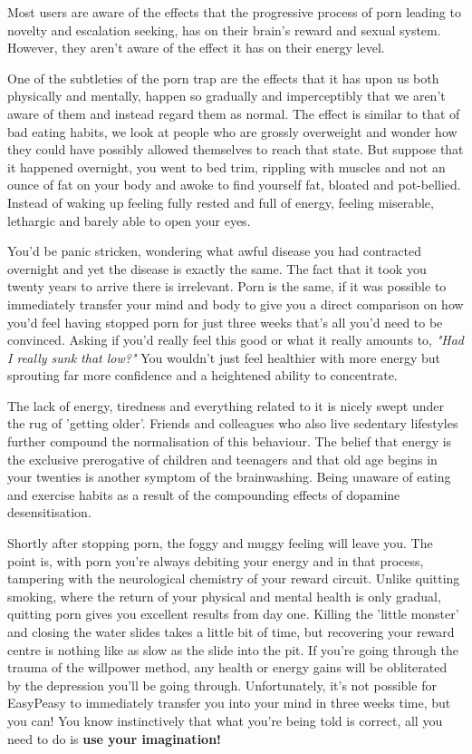 \documentclass[easypeasy.tex]{subfiles}
\begin{document}
Most users are aware of the effects that the progressive process of porn leading to novelty and escalation seeking, has on their brain's reward and sexual system. However, they aren't aware of the effect it has on their energy level.

One of the subtleties of the porn trap are the effects that it has upon us both physically and mentally, happen so gradually and imperceptibly that we aren't aware of them and instead regard them as normal. The effect is similar to that of bad eating habits, we look at people who are grossly overweight and wonder how they could have possibly allowed themselves to reach that state. But suppose that it happened overnight, you went to bed trim, rippling with muscles and not an ounce of fat on your body and awoke to find yourself fat, bloated and pot-bellied. Instead of waking up feeling fully rested and full of energy, feeling miserable, lethargic and barely able to open your eyes.

You'd be panic stricken, wondering what awful disease you had contracted overnight and yet the disease is exactly the same. The fact that it took you twenty years to arrive there is irrelevant. Porn is the same, if it was possible to immediately transfer your mind and body to give you a direct comparison on how you'd feel having stopped porn for just three weeks that's all you'd need to be convinced. Asking if you'd really feel this good or what it really amounts to, \textit{"Had I really sunk that low?"} You wouldn't just feel healthier with more energy but sprouting far more confidence and a heightened ability to concentrate.

The lack of energy, tiredness and everything related to it is nicely swept under the rug of 'getting older'. Friends and colleagues who also live sedentary lifestyles further compound the normalisation of this behaviour. The belief that energy is the exclusive prerogative of children and teenagers and that old age begins in your twenties is another symptom of the brainwashing. Being unaware of eating and exercise habits as a result of the compounding effects of dopamine desensitisation.

Shortly after stopping porn, the foggy and muggy feeling will leave you. The point is, with porn you're always debiting your energy and in that process, tampering with the neurological chemistry of your reward circuit. Unlike quitting smoking, where the return of your physical and mental health is only gradual, quitting porn gives you excellent results from day one. Killing the 'little monster' and closing the water slides takes a little bit of time, but recovering your reward centre is nothing like as slow as the slide into the pit. If you're going through the trauma of the willpower method, any health or energy gains will be obliterated by the depression you'll be going through. Unfortunately, it's not possible for EasyPeasy to immediately transfer you into your mind in three weeks time, but you can! You know instinctively that what you're being told is correct, all you need to do is \textbf{use your imagination!}
\end{document}
